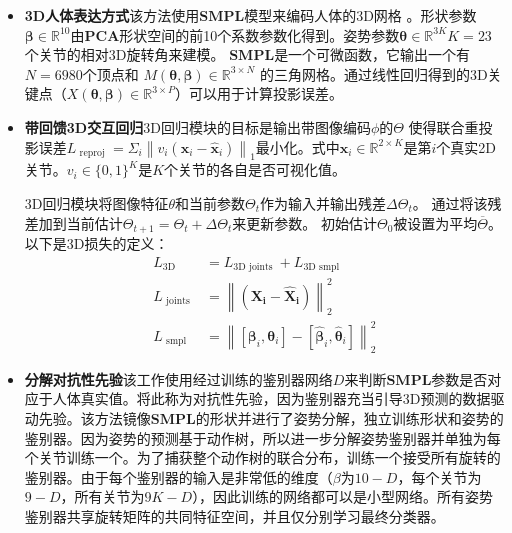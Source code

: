 \begin{itemize}
	\item \textbf{3D人体表达方式}该方法使用$\mathbf{SMPL}$模型来编码人体的3D网格
。形状参数$\boldsymbol{\beta} \in \mathbb{R}^{10}$由$\mathbf{PCA}$形状空间的前10个系数参数化得到。姿势参数$\boldsymbol{\theta} \in \mathbb{R}^{3 K}$$K = 23$个关节的相对3D旋转角来建模。 $\mathbf{SMPL}$是一个可微函数，它输出一个有$N=6980 $个顶点和
 $M(\boldsymbol{\theta}, \boldsymbol{\beta}) \in \mathbb{R}^{3 \times N}$ 的三角网格。通过线性回归得到的3D关键点（$X(\boldsymbol{\theta}, \boldsymbol{\beta}) \in \mathbb{R}^{3 \times P}$）可以用于计算投影误差。
 \item \textbf{带回馈3D交互回归}3D回归模块的目标是输出带图像编码$\phi$的$\Theta$
使得联合重投影误差$L_{\text { reproj }}=\Sigma_{i}\left\|v_{i}\left(\mathbf{x}_{i}-\hat{\mathbf{x}}_{i}\right)\right\|_{1}$最小化。式中$\mathbf{x}_{i} \in \mathbb{R}^{2 \times K}$是第$i$个真实2D关节。$v_{i} \in\{0,1\}^{K}$是$K$个关节的各自是否可视化值。

3D回归模块将图像特征$\theta$和当前参数$\Theta_t$作为输入并输出残差$\Delta \Theta_{t}$。 通过将该残差加到当前估计$\Theta_{t+1}=\Theta_{t}+\Delta \Theta_{t}$来更新参数。 初始估计$\Theta_0$被设置为平均$\overline{\Theta}$。 以下是3D损失的定义：
\begin{equation}
\begin{aligned} L_{3 \mathrm{D}} &=L_{3 \mathrm{D} \text { joints }}+L_{3 \mathrm{D} \text { smpl }} \\ L_{\text { joints }} &=\left\|\left(\mathbf{X}_{\mathbf{i}}-\hat{\mathbf{X}}_{\mathbf{i}}\right)\right\|_{2}^{2} \\ L_{\text { smpl }} &=\left\|\left[\boldsymbol{\beta}_{i}, \boldsymbol{\theta}_{i}\right]-\left[\hat{\boldsymbol{\beta}}_{i}, \hat{\boldsymbol{\theta}}_{i}\right]\right\|_{2}^{2} \end{aligned}
\end{equation}
\item \textbf{分解对抗性先验}该工作使用经过训练的鉴别器网络$D$来判断$\mathbf{SMPL}$参数是否对应于人体真实值。将此称为对抗性先验，因为鉴别器充当引导3D预测的数据驱动先验。该方法镜像$\mathbf{SMPL}$的形状并进行了姿势分解，独立训练形状和姿势的鉴别器。因为姿势的预测基于动作树，所以进一步分解姿势鉴别器并单独为每个关节训练一个。为了捕获整个动作树的联合分布，训练一个接受所有旋转的鉴别器。由于每个鉴别器的输入是非常低的维度（$\beta$为$10-D$，每个关节为$9-D$，所有关节为$9K-D$），因此训练的网络都可以是小型网络。所有姿势鉴别器共享旋转矩阵的共同特征空间，并且仅分别学习最终分类器。


\end{itemize}
